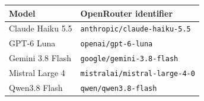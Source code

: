 \begin{tabular}{@{}ll@{}}
\toprule
Model & OpenRouter identifier \\
\midrule
Claude Haiku 5.5 & \texttt{anthropic/claude-haiku-5.5} \\
GPT-6 Luna & \texttt{openai/gpt-6-luna} \\
Gemini 3.8 Flash & \texttt{google/gemini-3.8-flash} \\
Mistral Large 4 & \texttt{mistralai/mistral-large-4-0} \\
Qwen3.8 Flash & \texttt{qwen/qwen3.8-flash} \\
\bottomrule
\end{tabular}
